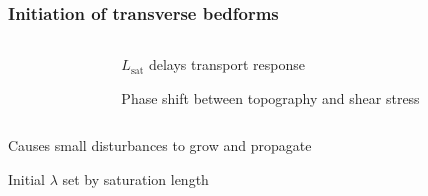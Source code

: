 \documentclass{beamer}
\begin{document}
\begin{frame}
  \frametitle{Initiation of transverse bedforms}

  \vspace{-1cm}

  \begin{columns}[t]

    \begin{column}{0.7\textwidth}

      \centering

      \resizebox{0.9\textwidth}{!}{\Large }

    \end{column}
    
    \begin{column}{0.3\textwidth}

      \centering

      \vspace{1cm}

      $L_{\text{sat}}$ delays transport response

      \vspace{1cm}

      Phase shift between topography and shear stress
      
    \end{column}


  \end{columns}

  \vspace{1cm}

  \centering 

  Causes small disturbances to grow and propagate

  \vspace{0.5cm}

  Initial $\lambda$ set by saturation length

\end{frame}
\end{document}
